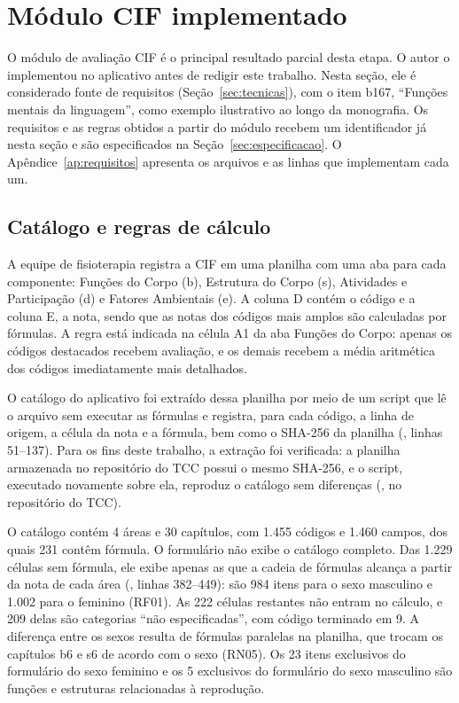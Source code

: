 \section{Módulo CIF implementado}
\label{sec:modulo-cif}

O módulo de avaliação CIF é o principal resultado parcial desta etapa. O autor o implementou no aplicativo antes de
redigir este trabalho. Nesta seção, ele é considerado fonte de requisitos (Seção~\ref{sec:tecnicas}), com o item
b167, ``Funções mentais da linguagem'', como exemplo ilustrativo ao longo da monografia. Os requisitos e as regras
obtidos a partir do módulo recebem um identificador já nesta seção e são especificados na
Seção~\ref{sec:especificacao}. O Apêndice~\ref{ap:requisitos} apresenta os arquivos e as linhas que implementam cada
um.

\subsection{Catálogo e regras de cálculo}
\label{sec:cif-catalogo}

A equipe de fisioterapia registra a CIF em uma planilha com uma aba para cada componente: Funções do Corpo (b),
Estrutura do Corpo (s), Atividades e Participação (d) e Fatores Ambientais (e). A coluna D contém o código e a coluna
E, a nota, sendo que as notas dos códigos mais amplos são calculadas por fórmulas. A regra está indicada na célula A1
da aba Funções do Corpo: apenas os códigos destacados recebem avaliação, e os demais recebem a média aritmética dos
códigos imediatamente mais detalhados.

O catálogo do aplicativo foi extraído dessa planilha por meio de um script que lê o arquivo sem executar as fórmulas
e registra, para cada código, a linha de origem, a célula da nota e a fórmula, bem como o SHA-256 da planilha
(, linhas 51--137). Para os fins deste trabalho, a extração foi verificada: a
planilha armazenada no repositório do TCC possui o mesmo SHA-256, e o script, executado novamente sobre ela, reproduz
o catálogo sem diferenças (, no repositório do TCC).

O catálogo contém 4 áreas e 30 capítulos, com 1.455 códigos e 1.460 campos, dos quais 231 contêm fórmula. O
formulário não exibe o catálogo completo. Das 1.229 células sem fórmula, ele exibe apenas as que a cadeia de fórmulas
alcança a partir da nota de cada área (, linhas 382--449): são 984 itens para o sexo
masculino e 1.002 para o feminino (RF01). As 222 células restantes não entram no cálculo, e 209 delas são categorias
``não especificadas'', com código terminado em 9. A diferença entre os sexos resulta de fórmulas paralelas na
planilha, que trocam os capítulos b6 e s6 de acordo com o sexo (RN05). Os 23 itens exclusivos do formulário do sexo
feminino e os 5 exclusivos do formulário do sexo masculino são funções e estruturas relacionadas à reprodução.

